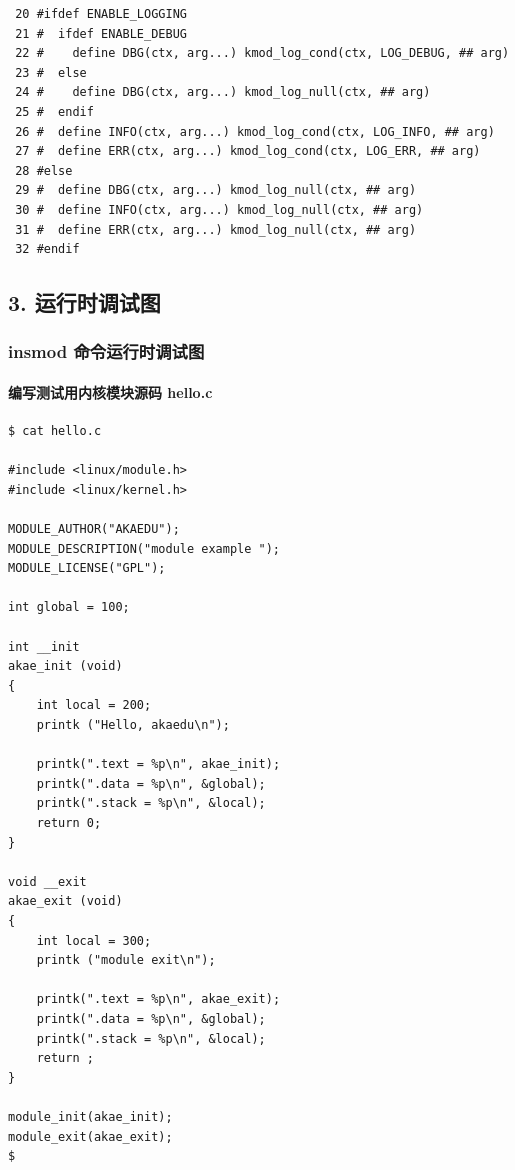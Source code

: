 \documentclass[11pt,a4paper]{article}
\begin{document}
{\begin{shaded}\begin{verbatim}
 20 #ifdef ENABLE_LOGGING
 21 #  ifdef ENABLE_DEBUG
 22 #    define DBG(ctx, arg...) kmod_log_cond(ctx, LOG_DEBUG, ## arg)
 23 #  else
 24 #    define DBG(ctx, arg...) kmod_log_null(ctx, ## arg)
 25 #  endif
 26 #  define INFO(ctx, arg...) kmod_log_cond(ctx, LOG_INFO, ## arg)
 27 #  define ERR(ctx, arg...) kmod_log_cond(ctx, LOG_ERR, ## arg)
 28 #else
 29 #  define DBG(ctx, arg...) kmod_log_null(ctx, ## arg)
 30 #  define INFO(ctx, arg...) kmod_log_null(ctx, ## arg)
 31 #  define ERR(ctx, arg...) kmod_log_null(ctx, ## arg)
 32 #endif
\end{verbatim}\end{shaded}}
\subsection{3. 运行时调试图}

\subsubsection{insmod 命令运行时调试图}

\paragraph{编写测试用内核模块源码 hello.c}

{\begin{shaded}\begin{verbatim}
$ cat hello.c 

#include <linux/module.h>
#include <linux/kernel.h>

MODULE_AUTHOR("AKAEDU");
MODULE_DESCRIPTION("module example ");
MODULE_LICENSE("GPL");

int global = 100;

int __init 
akae_init (void)
{
    int local = 200;
    printk ("Hello, akaedu\n");

    printk(".text = %p\n", akae_init);
    printk(".data = %p\n", &global);
    printk(".stack = %p\n", &local);
    return 0;
}

void __exit
akae_exit (void)
{
    int local = 300;
    printk ("module exit\n");

    printk(".text = %p\n", akae_exit);
    printk(".data = %p\n", &global);
    printk(".stack = %p\n", &local);
    return ;
}

module_init(akae_init);
module_exit(akae_exit);
$ 
\end{verbatim}\end{shaded}}
\end{document}
